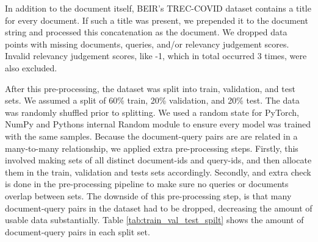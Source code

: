 \documentclass[sigconf, natbib=true]{acmart}
\begin{document}
In addition to the document itself, BEIR's TREC-COVID dataset contains a title for every document. 
If such a title was present, we prepended it to the document string and processed this concatenation as the document.
We dropped data points with missing documents, queries, and/or relevancy judgement scores.
Invalid relevancy judgement scores, like -1, which in total occurred 3 times, were also excluded.

After this pre-processing, the dataset was split into train, validation, and test sets.
We assumed a split of 60\% train, 20\% validation, and 20\% test.
The data was randomly shuffled prior to splitting. We used a random state for PyTorch, NumPy and Pythons internal Random module to ensure every model was trained with the same samples.
Because the document-query pairs are are related in a many-to-many relationship, we applied extra pre-processing steps. Firstly, this involved making sets of all distinct document-ids and query-ids, and then allocate them in the train, validation and tests sets accordingly. Secondly, and extra check is done in the pre-processing pipeline to make sure no queries or documents overlap between sets. The downside of this pre-processing step, is that many document-query pairs in the dataset had to be dropped, decreasing the amount of usable data substantially. 
Table \ref{tab:train_val_test_spilt} shows the amount of document-query pairs in each split set.
\end{document}
